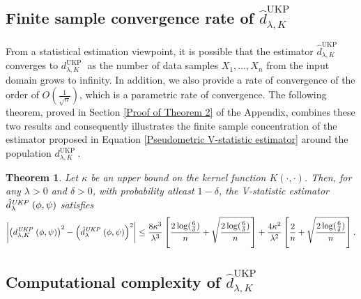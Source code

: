 \documentclass[11pt]{article}
\newcommand{\repone}{\phi}
\newcommand{\reptwo}{\psi}
\newcommand{\metricstname}{UKP }
\theoremstyle{plain}
\newcounter{theoremno}
\newtheorem{theorem}[theoremno]{Theorem}
\begin{document}
\subsection{Finite sample convergence rate of $\hat{d}_{\lambda,K}^{\text{\metricstname}}$} \label{Finite sample convergence rate}

From a statistical estimation viewpoint, it is possible that the estimator $\hat{d}_{\lambda,K}^{\text{\metricstname}}$ converges to $d_{\lambda,K}^{\text{\metricstname}}$ as the number of data samples $X_{1},\dots,X_{n}$ from the input domain grows to infinity. In addition, we also provide a rate of convergence of the order of $O(\frac{1}{\sqrt{n}})$, which is a parametric rate of convergence. The following theorem, proved in Section \ref{Proof of Theorem 2} of the Appendix, combines these two results and consequently illustrates the finite sample concentration of the  estimator proposed in Equation \eqref{Pseudometric V-statistic estimator} around the population $d_{\lambda,K}^{\text{\metricstname}}$.

\begin{theorem} \label{Theorem: Finite sample convergence}
    Let $\kappa$ be an upper bound on the kernel function $K(\cdot,\cdot)$. Then, for any $\lambda>0$ and $\delta>0$, with probability atleast $1-\delta$, the V-statistic estimator $\hat{d}_{\lambda}^{\emph{\metricstname}}(\repone,\reptwo)$ satisfies
    \[
    \begin{aligned}
    \left|\left(d_{\lambda,K}^{\emph{\metricstname}}(\repone,\reptwo)\right)^{2}-\left(\hat{d}_{\lambda}^{\emph{\metricstname}}(\repone,\reptwo)\right)^{2}\right|\leq \frac{8\kappa^{3}}{\lambda^{3}}\left[\frac{2\log(\frac{6}{\delta})}{n} + \sqrt{\frac{2\log(\frac{6}{\delta})}{n}}\right]+ \frac{4\kappa^{2}}{\lambda^{2}}\left[\frac{2}{n} + \sqrt{\frac{2\log(\frac{6}{\delta})}{n}}\right] .
    \end{aligned}
    \]
\end{theorem}

\subsection{Computational complexity of $\hat{d}_{\lambda,K}^{\text{\metricstname}}$}
\end{document}
